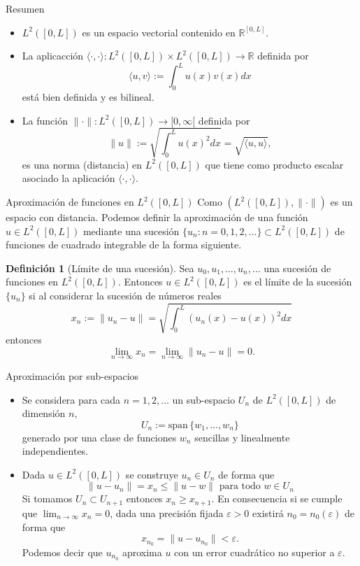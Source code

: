 \documentclass[10pt,handout]{beamer}
\theoremstyle{plain} %
\theoremstyle{plain} %
\theoremstyle{plain} %
\theoremstyle{plain} %
\theoremstyle{definition}
\newtheorem{defn}{Definici\'on}
\theoremstyle{example}
\theoremstyle{example}
\theoremstyle{remark}
\theoremstyle{remark}
\begin{document}
\begin{frame}{Resumen}
\begin{itemize}
\item $L^2([0,L])$ es un espacio vectorial contenido en $\mathbb{R}^{[0,L]}.$
\item La aplicacción $\langle \cdot, \cdot \rangle: L^2([0,L]) \times L^2([0,L]) 
\longrightarrow \mathbb{R}$ definida por
$$
\langle u,v \rangle:= \int_0^L u(x)v(x) dx
$$
está bien definida y es bilineal.
\item La función $\|\cdot\|: L^2([0,L]) \longrightarrow [0,\infty[$ definida por
$$
\| u\|:= \sqrt{\int_0^L u(x)^2 dx} = \sqrt{\langle u,u \rangle},
$$
es una norma (distancia) en $L^2([0,L])$ que tiene como producto escalar asociado la aplicación
$\langle \cdot, \cdot \rangle.$
\end{itemize}
\end{frame}


\begin{frame}{Aproximación de funciones en $L^2([0,L])$}
Como $(L^2([0,L]),\|\cdot\|)$ es un espacio con distancia. Podemos definir la aproximación de una función $u \in L^2([0,L])$ mediante una sucesión
$\{u_n: n=0,1,2,\ldots\} \subset L^2([0,L])$ de funciones de cuadrado integrable de la forma siguiente.
\begin{defn}[Límite de una sucesión]
Sea $u_0,u_1,\ldots,u_n,\ldots$ una sucesión de funciones en $L^2([0,L]).$ Entonces $u \in L^2([0,L])$ es el límite de la sucesión $\{u_n\}$ si al considerar la sucesión de números reales
$$
x_n := \|u_n -u\| = \sqrt{\int_0^L(u_n(x)-u(x))^2 dx}
$$
entonces 
$$
\lim_{n \rightarrow \infty} x_n = \lim_{n \rightarrow \infty} \|u_n -u\| = 0.
$$
\end{defn}
\end{frame}

\begin{frame}{Aproximación por sub-espacios}
\begin{itemize}
\item Se considera para cada $n=1,2,\ldots$ un sub-espacio $U_n$ de $L^2([0,L])$
de dimensión $n,$
$$
U_n:=\mathrm{span}\,\{w_1,\ldots,w_n\}
$$
generado por una clase de funciones $w_n$ sencillas y linealmente independientes.
\item Dada $u \in L^2([0,L])$ se construye $u_n \in U_n$ de forma que
$$
\|u-u_n\| = x_n \le \|u-w\| \text{ para todo } w \in U_n
$$
Si tomamos $U_n \subset U_{n+1}$ entonces $x_n \ge x_{n+1}.$ En consecuencia si se cumple que $\lim_{n\rightarrow \infty} x_n = 0$, dada una precisión fijada $\varepsilon > 0$ existirá $n_0=n_0(\varepsilon)$
de forma que
$$
x_{n_0} = \|u-u_{n_0}\| < \varepsilon. 
$$ 
Podemos decir que $u_{n_0}$ aproxima $u$ con un error cuadrático no superior a $\varepsilon.$
\end{itemize}
\end{frame}
\end{document}
